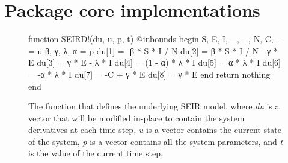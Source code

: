 \chapter{Package core implementations}

\begin{figure}[!htb]
\centering
\begin{jllisting}
function SEIRD!(du, u, p, t)
    @inbounds begin
        S, E, I, _, _, N, C, _ = u
        β, γ, λ, α = p
        du[1] = -β * S * I / N
        du[2] = β * S * I / N - γ * E
        du[3] = γ * E - λ * I
        du[4] = (1 - α) * λ * I
        du[5] = α * λ * I
        du[6] = -α * λ * I
        du[7] = -C + γ * E
        du[8] = γ * E
    end
    return nothing
end
\end{jllisting}
\caption{The function that defines the underlying SEIR model, where \textit{du} is a vector that will be modified in-place to contain the system derivatives at each time step, \textit{u} is a vector contains the current state of the system, \textit{p} is a vector contains all the system parameters, and \textit{t} is the value of the current time step.}
\label{fig:diffeq-seird-inplace}
\end{figure}

